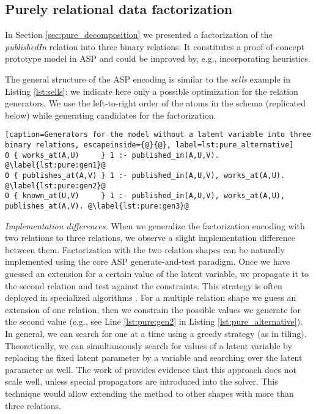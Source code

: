 \subsection{Purely relational data factorization}
In Section \ref{sec:pure_decomposition} we presented a factorization of the \emph{publishedIn} relation into three binary relations. It constitutes a proof-of-concept prototype model in ASP and could be improved by, e.g., incorporating heuristics. %

The general structure of the ASP encoding is similar to the \emph{sells} example in Listing \ref{lst:sells}: we indicate here only a possible optimization for the relation generators.  We use the left-to-right order of the atoms in the schema (replicated below) while generating candidates for the factorization.

\begin{lstlisting}[caption=Generators for the model without a latent variable into three binary relations, escapeinside={@}{@}, label=lst:pure_alternative] 
0 { works_at(A,U)     } 1 :- published_in(A,U,V). @\label{lst:pure:gen1}@
0 { publishes_at(A,V) } 1 :- published_in(A,U,V), works_at(A,U). @\label{lst:pure:gen2}@
0 { known_at(U,V)     } 1 :- published_in(A,U,V), works_at(A,U), publishes_at(A,V). @\label{lst:pure:gen3}@
\end{lstlisting}


\textit{Implementation differences.} When we generalize the factorization encoding with two relations to three relations, we observe a slight implementation difference between them. Factorization with the two relation shapes can be naturally implemented using the core ASP generate-and-test paradigm. Once we have guessed an extension for a certain value of the latent variable, we propagate it to the second relation and test against the constraints. This strategy is often deployed in specialized algorithms \parencite{tiling, dbp}.
For a multiple relation shape we guess an extension of one relation, then we constrain the possible values we generate for the second value (e.g., see Line \ref{lst:pure:gen2} in Listing \ref{lst:pure_alternative}). In general, we can search for one at a time using a greedy strategy (as in tiling). Theoretically, we can simultaneously search for values of a latent variable by replacing the fixed latent parameter by a variable and searching over the latent parameter as well. The work of \cite{tias_topk} provides evidence that this approach does not scale well, unless special propagators are introduced into the solver. This technique would allow extending the method to other shapes with more than three relations.

